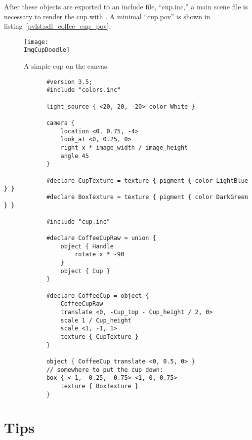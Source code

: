 		After these objects
		are exported to an include file, ``cup.inc,''
		a main scene file is necessary to render the cup
		with \IXpov{}. A minimal ``cup.pov'' is shown in
		listing~\ref{pvlst:sdl_coffee_cup_pov}.

		\begin{figure}[htbp]
		\centering
		\texttt{[image: \\ImgCupDoodle]}
		\caption{A simple cup on the \dtypkg{} canvas.}
		\label{fig:cup_doodle}
		\end{figure}

		\begin{povsdl}
			{\small
			\begin{verbatim}
			#version 3.5;
			#include "colors.inc"
			
			light_source { <20, 20, -20> color White }
			
			camera {
			    location <0, 0.75, -4>
			    look_at <0, 0.25, 0>
			    right x * image_width / image_height
			    angle 45
			}
			
			#declare CupTexture = texture { pigment { color LightBlue } }
			#declare BoxTexture = texture { pigment { color DarkGreen } }
			
			#include "cup.inc"
			
			#declare CoffeeCupRaw = union {
			    object { Handle
			        rotate x * -90
			    }
			    object { Cup }
			}
			
			#declare CoffeeCup = object {
			    CoffeeCupRaw
			    translate <0, -Cup_top - Cup_height / 2, 0>
			    scale 1 / Cup_height
			    scale <1, -1, 1>
			    texture { CupTexture }
			}
			
			object { CoffeeCup translate <0, 0.5, 0> }
			// somewhere to put the cup down:
			box { <-1, -0.25, -0.75> <1, 0, 0.75>
			    texture { BoxTexture }
			}
			\end{verbatim}
			}%
		\caption{\dtypov{} SDL for a simple coffee cup scene.}
		\label{pvlst:sdl_coffee_cup_pov}
		\end{povsdl}


	\section{Tips}%
	\label{sec:tips_tricks}


